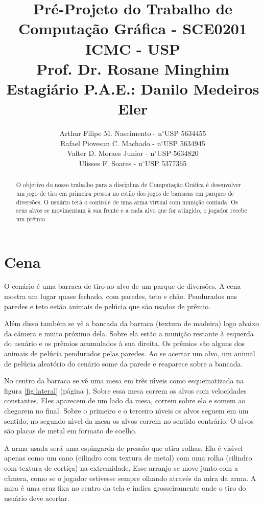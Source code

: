 \documentclass[a4paper,10pt]{article}
\title{
Pr\'e-Projeto do Trabalho de\\ Computa\c c\~ao Gr\'afica - SCE0201\\\vspace{0.5cm}
ICMC - USP\\\vspace{0.5cm}
Prof\textordfeminine{}. Dr\textordfeminine{}. Rosane Minghim\\
Estagi\'ario P.A.E.: Danilo Medeiros Eler
}
\author{
Arthur Filipe M. Nascimento - n\ensuremath{^\circ}USP 5634455\\
Rafael Piovesan C. Machado - n\ensuremath{^\circ}USP 5634945\\
Valter D. Moraes Junior - n\ensuremath{^\circ}USP 5634820\\
Ulisses F. Soares - n\ensuremath{^\circ}USP 5377365
}
\date{}
\begin{document}
\maketitle

\tableofcontents

\begin{abstract}
 O objetivo do nosso trabalho para a disciplina de Computa\c c\~ao Gr\'afica \'e desenvolver um jogo de tiro em primeira pessoa no estilo dos jogos de barracas em parques de divers\~oes. O usu\'ario ter\'a o controle de uma arma virtual com muni\c c\~ao contada. Os seus alvos se movimentam \`a sua frente e a cada alvo que for atingido, o jogador recebe um pr\^emio.
\end{abstract}


\section{Cena}

O cen\'ario \'e uma barraca de tiro-ao-alvo de um parque de divers\~oes. A cena mostra um lugar quase fechado, com paredes, teto e ch\~ao. Pendurados nas paredes e teto est\~ao animais de pel\'ucia que s\~ao usados de pr\^emio.

Al\'em disso tamb\'em se v\^e a bancada da barraca (textura de madeira) logo abaixo da c\^amera e muito pr\'oximo dela. Sobre ela est\~ao a muni\c c\~ao restante \`a esquerda do usu\'ario e os pr\^emios acumulados \`a sua direita. Os pr\^emios s\~ao alguns dos animais de pel\'ucia pendurados pelas paredes. Ao se acertar um alvo, um animal de pel\'ucia aleat\'orio do cen\'ario some da parede e reaparece sobre a bancada.

No centro da barraca se v\^e uma mesa em tr\^es n\'\i{}veis como esquematizada na figura \ref{fig:lateral} (p\'agina \pageref{fig:lateral}). Sobre essa mesa correm os alvos com velocidades constantes. Eles aparecem de um lado da mesa, correm sobre ela e somem ao chegarem no final. Sobre o primeiro e o terceiro n\'\i{}veis os alvos seguem em um sentido; no segundo n\'\i{}vel da mesa os alvos correm no sentido contr\'ario. O alvos s\~ao placas de metal em formato de coelho.

A arma usada ser\'a uma espingarda de press\~ao que atira rolhas. Ela \'e vis\'\i{}vel apenas como um cano (cilindro com textura de metal) com uma rolha (cilindro com textura de corti\c ca) na extremidade. Esse arranjo se move junto com a c\^amera, como se o jogador estivesse sempre olhando atrav\'es da mira da arma. A mira \'e uma cruz fixa no centro da tela e indica grosseiramente onde o tiro do usu\'ario deve acertar.
\end{document}
